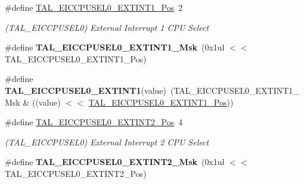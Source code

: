 \begin{DoxyCompactItemize}
\item 
\hypertarget{group___s_a_m_l21___t_a_l_gaa90054cb275e9a883e0d4a4b7c58c68f}{}\#define \hyperlink{group___s_a_m_l21___t_a_l_gaa90054cb275e9a883e0d4a4b7c58c68f}{T\+A\+L\+\_\+\+E\+I\+C\+C\+P\+U\+S\+E\+L0\+\_\+\+E\+X\+T\+I\+N\+T1\+\_\+\+Pos}~2\label{group___s_a_m_l21___t_a_l_gaa90054cb275e9a883e0d4a4b7c58c68f}

\begin{DoxyCompactList}\small\item\em (T\+A\+L\+\_\+\+E\+I\+C\+C\+P\+U\+S\+E\+L0) External Interrupt 1 C\+P\+U Select \end{DoxyCompactList}\item 
\hypertarget{group___s_a_m_l21___t_a_l_ga302cdc071fe8cd4afde6fe2cb76ad43a}{}\#define {\bfseries T\+A\+L\+\_\+\+E\+I\+C\+C\+P\+U\+S\+E\+L0\+\_\+\+E\+X\+T\+I\+N\+T1\+\_\+\+Msk}~(0x1ul $<$$<$ T\+A\+L\+\_\+\+E\+I\+C\+C\+P\+U\+S\+E\+L0\+\_\+\+E\+X\+T\+I\+N\+T1\+\_\+\+Pos)\label{group___s_a_m_l21___t_a_l_ga302cdc071fe8cd4afde6fe2cb76ad43a}

\item 
\hypertarget{group___s_a_m_l21___t_a_l_ga0d69fa54298fa6dd5874bde444f8b6aa}{}\#define {\bfseries T\+A\+L\+\_\+\+E\+I\+C\+C\+P\+U\+S\+E\+L0\+\_\+\+E\+X\+T\+I\+N\+T1}(value)~(T\+A\+L\+\_\+\+E\+I\+C\+C\+P\+U\+S\+E\+L0\+\_\+\+E\+X\+T\+I\+N\+T1\+\_\+\+Msk \& ((value) $<$$<$ \hyperlink{group___s_a_m_l21___t_a_l_gaa90054cb275e9a883e0d4a4b7c58c68f}{T\+A\+L\+\_\+\+E\+I\+C\+C\+P\+U\+S\+E\+L0\+\_\+\+E\+X\+T\+I\+N\+T1\+\_\+\+Pos}))\label{group___s_a_m_l21___t_a_l_ga0d69fa54298fa6dd5874bde444f8b6aa}

\item 
\hypertarget{group___s_a_m_l21___t_a_l_gabc96e29420d608f7b4e758e04f7ae07b}{}\#define \hyperlink{group___s_a_m_l21___t_a_l_gabc96e29420d608f7b4e758e04f7ae07b}{T\+A\+L\+\_\+\+E\+I\+C\+C\+P\+U\+S\+E\+L0\+\_\+\+E\+X\+T\+I\+N\+T2\+\_\+\+Pos}~4\label{group___s_a_m_l21___t_a_l_gabc96e29420d608f7b4e758e04f7ae07b}

\begin{DoxyCompactList}\small\item\em (T\+A\+L\+\_\+\+E\+I\+C\+C\+P\+U\+S\+E\+L0) External Interrupt 2 C\+P\+U Select \end{DoxyCompactList}\item 
\hypertarget{group___s_a_m_l21___t_a_l_ga9314a6017f389aec639009f56ce87122}{}\#define {\bfseries T\+A\+L\+\_\+\+E\+I\+C\+C\+P\+U\+S\+E\+L0\+\_\+\+E\+X\+T\+I\+N\+T2\+\_\+\+Msk}~(0x1ul $<$$<$ T\+A\+L\+\_\+\+E\+I\+C\+C\+P\+U\+S\+E\+L0\+\_\+\+E\+X\+T\+I\+N\+T2\+\_\+\+Pos)\label{group___s_a_m_l21___t_a_l_ga9314a6017f389aec639009f56ce87122}


\end{DoxyCompactItemize}
